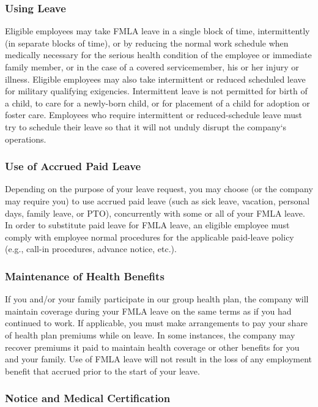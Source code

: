 \documentclass{book}
\begin{document}
\subsubsection{Using Leave}

Eligible employees may take FMLA leave in a single block of time, intermittently (in separate blocks of time), or by reducing the normal work schedule when medically necessary for the serious health condition of the employee or immediate family member, or in the case of a covered servicemember, his or her injury or illness. Eligible employees may also take intermittent or reduced scheduled leave for military qualifying exigencies. Intermittent leave is not permitted for birth of a child, to care for a newly-born child, or for placement of a child for adoption or foster care. Employees who require intermittent or reduced-schedule leave must try to schedule their leave so that it will not unduly disrupt the company‘s operations.

\subsubsection{Use of Accrued Paid Leave}

Depending on the purpose of your leave request, you may choose (or the company may require you) to use accrued paid leave (such as sick leave, vacation, personal days, family leave, or PTO), concurrently with some or all of your FMLA leave. In order to substitute paid leave for FMLA leave, an eligible employee must comply with employee normal procedures for the applicable paid-leave policy (e.g., call-in procedures, advance notice, etc.).

\subsubsection{Maintenance of Health Benefits}

If you and/or your family participate in our group health plan, the company will maintain coverage during your FMLA leave on the same terms as if you had continued to work. If applicable, you must make arrangements to pay your share of health plan premiums while on leave. In some instances, the company may recover premiums it paid to maintain health coverage or other benefits for you and your family. Use of FMLA leave will not result in the loss of any employment benefit that accrued prior to the start of your leave.

\subsubsection{Notice and Medical Certification}
\end{document}
